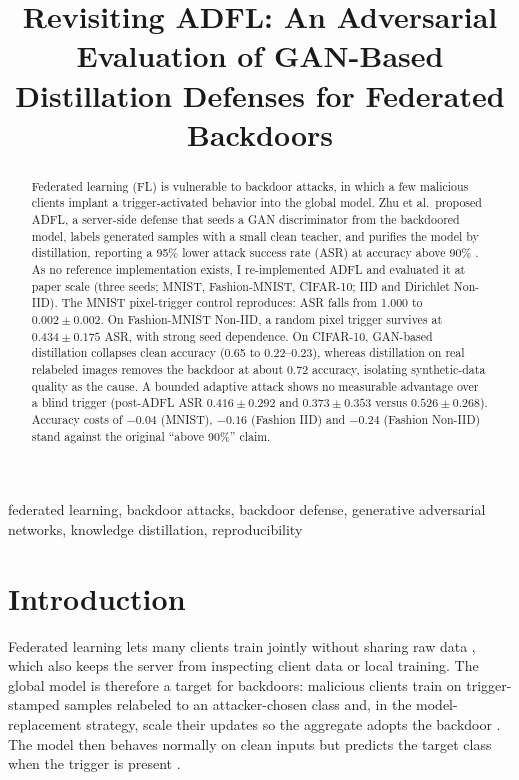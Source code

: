 \documentclass[conference]{IEEEtran}
\begin{document}

\title{Revisiting ADFL: An Adversarial Evaluation of GAN-Based Distillation Defenses for Federated Backdoors}

\author{
}

\maketitle

\begin{abstract}
Federated learning (FL) is vulnerable to backdoor attacks, in which a few malicious clients implant a trigger-activated behavior into the global model. Zhu et al.\ proposed ADFL, a server-side defense that seeds a GAN discriminator from the backdoored model, labels generated samples with a small clean teacher, and purifies the model by distillation, reporting a 95\% lower attack success rate (ASR) at accuracy above 90\% \cite{zhu2023adfl}. As no reference implementation exists, I re-implemented ADFL and evaluated it at paper scale (three seeds; MNIST, Fashion-MNIST, CIFAR-10; IID and Dirichlet Non-IID). The MNIST pixel-trigger control reproduces: ASR falls from 1.000 to $0.002\pm0.002$. On Fashion-MNIST Non-IID, a random pixel trigger survives at $0.434\pm0.175$ ASR, with strong seed dependence. On CIFAR-10, GAN-based distillation collapses clean accuracy (0.65 to 0.22--0.23), whereas distillation on real relabeled images removes the backdoor at about 0.72 accuracy, isolating synthetic-data quality as the cause. A bounded adaptive attack shows no measurable advantage over a blind trigger (post-ADFL ASR $0.416\pm0.292$ and $0.373\pm0.353$ versus $0.526\pm0.268$). Accuracy costs of $-0.04$ (MNIST), $-0.16$ (Fashion IID) and $-0.24$ (Fashion Non-IID) stand against the original ``above 90\%'' claim.
\end{abstract}

\begin{IEEEkeywords}
federated learning, backdoor attacks, backdoor defense, generative adversarial networks, knowledge distillation, reproducibility
\end{IEEEkeywords}

\section{Introduction}
Federated learning lets many clients train jointly without sharing raw data \cite{mcmahan2017fedavg,kairouz2021advances}, which also keeps the server from inspecting client data or local training. The global model is therefore a target for backdoors: malicious clients train on trigger-stamped samples relabeled to an attacker-chosen class and, in the model-replacement strategy, scale their updates so the aggregate adopts the backdoor \cite{bagdasaryan2020backdoor,bhagoji2019adversarial,sun2019backdoor}. The model then behaves normally on clean inputs but predicts the target class when the trigger is present \cite{gu2017badnets}.
\end{document}
